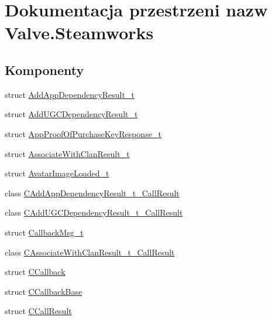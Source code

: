 \hypertarget{namespace_valve_1_1_steamworks}{}\section{Dokumentacja przestrzeni nazw Valve.\+Steamworks}
\label{namespace_valve_1_1_steamworks}
\subsection*{Komponenty}
\begin{DoxyCompactItemize}
\item 
struct \hyperlink{struct_valve_1_1_steamworks_1_1_add_app_dependency_result__t}{Add\+App\+Dependency\+Result\+\_\+t}
\item 
struct \hyperlink{struct_valve_1_1_steamworks_1_1_add_u_g_c_dependency_result__t}{Add\+U\+G\+C\+Dependency\+Result\+\_\+t}
\item 
struct \hyperlink{struct_valve_1_1_steamworks_1_1_app_proof_of_purchase_key_response__t}{App\+Proof\+Of\+Purchase\+Key\+Response\+\_\+t}
\item 
struct \hyperlink{struct_valve_1_1_steamworks_1_1_associate_with_clan_result__t}{Associate\+With\+Clan\+Result\+\_\+t}
\item 
struct \hyperlink{struct_valve_1_1_steamworks_1_1_avatar_image_loaded__t}{Avatar\+Image\+Loaded\+\_\+t}
\item 
class \hyperlink{class_valve_1_1_steamworks_1_1_c_add_app_dependency_result__t___call_result}{C\+Add\+App\+Dependency\+Result\+\_\+t\+\_\+\+Call\+Result}
\item 
class \hyperlink{class_valve_1_1_steamworks_1_1_c_add_u_g_c_dependency_result__t___call_result}{C\+Add\+U\+G\+C\+Dependency\+Result\+\_\+t\+\_\+\+Call\+Result}
\item 
struct \hyperlink{struct_valve_1_1_steamworks_1_1_callback_msg__t}{Callback\+Msg\+\_\+t}
\item 
class \hyperlink{class_valve_1_1_steamworks_1_1_c_associate_with_clan_result__t___call_result}{C\+Associate\+With\+Clan\+Result\+\_\+t\+\_\+\+Call\+Result}
\item 
struct \hyperlink{struct_valve_1_1_steamworks_1_1_c_callback}{C\+Callback}
\item 
struct \hyperlink{struct_valve_1_1_steamworks_1_1_c_callback_base}{C\+Callback\+Base}
\item 
struct \hyperlink{struct_valve_1_1_steamworks_1_1_c_call_result}{C\+Call\+Result}
\item 

\end{DoxyCompactItemize}
